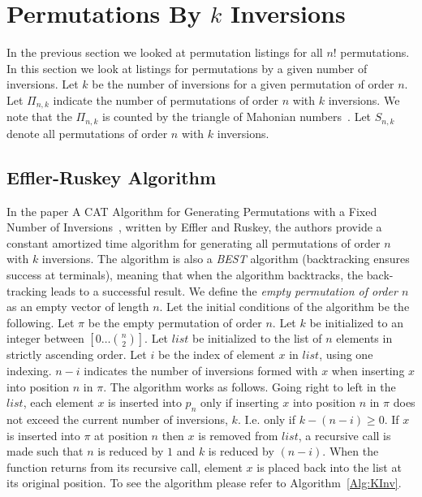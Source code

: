 

\section{Permutations By $k$ Inversions}
In the previous section we looked at permutation listings for all $n!$ permutations. In this section we look at 
listings for permutations by a given number of inversions. Let $k$ be the number of inversions for a given permutation 
of order $n$. Let $\Pi_{n,k}$ indicate the number of permutations of order $n$ with $k$ inversions. We note that the $\Pi_{n,k}$ is counted by 
the triangle of Mahonian numbers~\cite{A40}. Let \emph{$S_{n,k}$} denote all permutations of order $n$ with $k$ inversions. 
\subsection{Effler-Ruskey Algorithm}
In the paper A CAT Algorithm for Generating Permutations with a Fixed Number of Inversions~\cite{A26}, 
written by Effler and Ruskey, the authors provide a constant amortized time algorithm for 
generating all permutations of order $n$ with $k$ inversions. 
The algorithm is also a \emph{BEST} algorithm (backtracking ensures success at terminals), meaning that when the algorithm backtracks, 
the back-tracking leads to a successful result. We define the \emph{empty permutation of order $n$} as an empty 
vector of length $n$.
Let the initial conditions of the algorithm be the following. Let $\pi$ be the empty permutation of order $n$. 
Let $k$ be initialized to an integer between $[0 \dots {n \choose 2}]$. 
Let $list$ be initialized to the list of $n$ elements in strictly ascending order. 
Let $i$ be the index of element $x$ in $list$, using one indexing. $n-i$ 
indicates the number of inversions formed with $x$ when inserting $x$ into position $n$ in $\pi$.
The algorithm works as follows.
Going right to left in the $list$, each element $x$ is inserted into $p_{n}$
only if inserting $x$ into position $n$ in $\pi$ does not exceed the current number of inversions, $k$. I.e. only 
if $k- (n-i)\geq 0$.
If $x$ is inserted into $\pi$ at position $n$ then $x$ is removed from $list$, a recursive call is made such that $n$ is reduced by 
$1$ and $k$ is reduced by $(n-i)$. When the function returns from its recursive call, element $x$ is placed back into the list 
at its original position. To see the algorithm please refer to Algorithm~\ref{Alg:KInv}.
